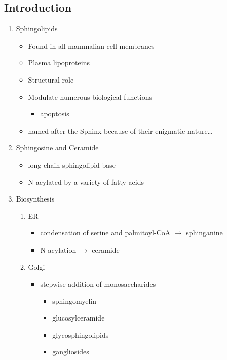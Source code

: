 \documentclass{scrartcl}
\begin{document}
\subsection{Introduction}
\label{sec:org961afa0}
\begin{enumerate}
\item Sphingolipids
\label{sec:org64324b9}
\begin{itemize}
\item Found in all mammalian cell membranes
\item Plasma lipoproteins
\item Structural role
\item Modulate numerous biological functions
\begin{itemize}
\item apoptosis
\end{itemize}
\item named after the Sphinx because of their enigmatic nature\ldots{}
\end{itemize}

\item Sphingosine and Ceramide
\label{sec:orgc383aac}

\begin{itemize}
\item long chain sphingolipid base
\item N-acylated by a variety of fatty acids
\end{itemize}


\item Biosynthesis
\label{sec:orge14e826}

\begin{enumerate}
\item ER
\label{sec:org23dae89}
\begin{itemize}
\item condensation of serine and palmitoyl-CoA \(\to\) sphinganine
\item N-acylation \(\to\) ceramide
\end{itemize}

\item Golgi
\label{sec:org19c9c1d}
\begin{itemize}
\item stepwise addition of monosaccharides
\begin{itemize}
\item sphingomyelin
\item glucosylceramide
\item glycosphingolipids
\item gangliosides
\end{itemize}
\end{itemize}



\end{enumerate}
\end{enumerate}
\end{document}
